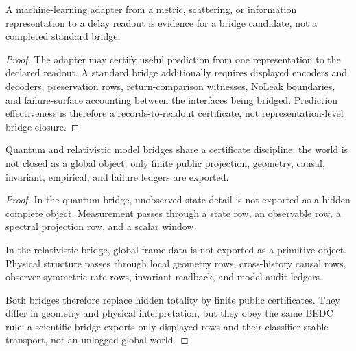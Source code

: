 \begin{corollary}
\label{cor:philosophy-bridge-learning-evidence-not-closure}
A machine-learning adapter from a metric, scattering, or information
representation to a delay readout is evidence for a bridge candidate,
not a completed standard bridge.
\end{corollary}
\begin{proof}
The adapter may certify useful prediction from one representation to the
declared readout. A standard bridge additionally requires displayed
encoders and decoders, preservation rows, return-comparison witnesses,
NoLeak boundaries, and failure-surface accounting between the
interfaces being bridged. Prediction effectiveness is therefore a
records-to-readout certificate, not representation-level bridge closure.
\end{proof}

\begin{theorem}
\label{thm:philosophy-common-physical-bridge-discipline}
Quantum and relativistic model bridges share a certificate discipline: the
world is not closed as a global object; only finite public projection,
geometry, causal, invariant, empirical, and failure ledgers are exported.
\end{theorem}
\begin{proof}
In the quantum bridge, unobserved state detail is not exported as a hidden
complete object. Measurement passes through a state row, an observable row, a
spectral projection row, and a scalar window.

In the relativistic bridge, global frame data is not exported as a primitive
object. Physical structure passes through local geometry rows,
cross-history causal rows, observer-symmetric rate rows, invariant readback,
and model-audit ledgers.

Both bridges therefore replace hidden totality by finite public certificates.
They differ in geometry and physical interpretation, but they obey the same
BEDC rule: a scientific bridge exports only displayed rows and their
classifier-stable transport, not an unlogged global world.
\end{proof}

